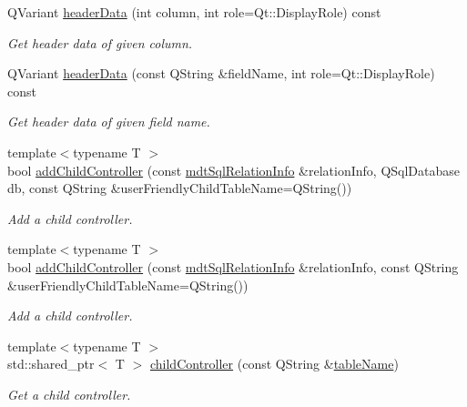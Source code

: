 \begin{DoxyCompactItemize}
Q\-Variant \hyperlink{classmdt_abstract_sql_table_controller_aae2c2912d99d33e6e0e3b010d218007f}{header\-Data} (int column, int role=Qt\-::\-Display\-Role) const 
\begin{DoxyCompactList}\small\item\em Get header data of given column. \end{DoxyCompactList}\item 
Q\-Variant \hyperlink{classmdt_abstract_sql_table_controller_a9b022656604a245f4517ed3a8df1ac37}{header\-Data} (const Q\-String \&field\-Name, int role=Qt\-::\-Display\-Role) const 
\begin{DoxyCompactList}\small\item\em Get header data of given field name. \end{DoxyCompactList}\item 
{\footnotesize template$<$typename T $>$ }\\bool \hyperlink{classmdt_abstract_sql_table_controller_a448966fc2696cc2cef31f4663ccde662}{add\-Child\-Controller} (const \hyperlink{classmdt_sql_relation_info}{mdt\-Sql\-Relation\-Info} \&relation\-Info, Q\-Sql\-Database db, const Q\-String \&user\-Friendly\-Child\-Table\-Name=Q\-String())
\begin{DoxyCompactList}\small\item\em Add a child controller. \end{DoxyCompactList}\item 
{\footnotesize template$<$typename T $>$ }\\bool \hyperlink{classmdt_abstract_sql_table_controller_a9ca5ec3bd1c98e7b5576de86712f220b}{add\-Child\-Controller} (const \hyperlink{classmdt_sql_relation_info}{mdt\-Sql\-Relation\-Info} \&relation\-Info, const Q\-String \&user\-Friendly\-Child\-Table\-Name=Q\-String())
\begin{DoxyCompactList}\small\item\em Add a child controller. \end{DoxyCompactList}\item 
{\footnotesize template$<$typename T $>$ }\\std\-::shared\-\_\-ptr$<$ T $>$ \hyperlink{classmdt_abstract_sql_table_controller_a4096d1eca87219a9abe4ab3e90943d81}{child\-Controller} (const Q\-String \&\hyperlink{classmdt_abstract_sql_table_controller_aaf864d069aeb74068b6daa747b740944}{table\-Name})
\begin{DoxyCompactList}\small\item\em Get a child controller. \end{DoxyCompactList}\item 

\end{DoxyCompactItemize}
